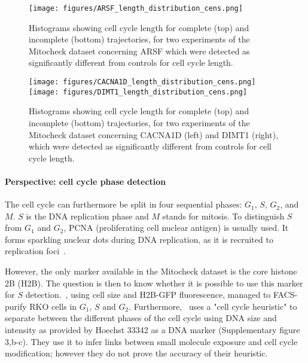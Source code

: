 \begin{figure*}[ht!]
\centerline{\texttt{[image: figures/ARSF\_length\_distribution\_cens.png]}}
\caption{Histograms showing cell cycle length for complete (top) and incomplete (bottom) trajectories, for two experiments of the Mitocheck dataset concerning ARSF which were detected as significantly different from controls for cell cycle length.}
\label{ARSF}
\end{figure*}
\begin{figure*}[ht!]
\centerline{\texttt{[image: figures/CACNA1D\_length\_distribution\_cens.png]}
\texttt{[image: figures/DIMT1\_length\_distribution\_cens.png]}
}
\caption{Histograms showing cell cycle length for complete (top) and incomplete (bottom) trajectories, for two experiments of the Mitocheck dataset concerning CACNA1D (left) and DIMT1 (right), which were detected as significantly different from controls for cell cycle length.}
\label{CAC}
\end{figure*}

\paragraph{Perspective: cell cycle phase detection}
The cell cycle can furthermore be split in four sequential phases: $G_1$, $S$, $G_2$, and $M$. $S$ is the DNA replication phase and $M$ stands for mitosis. To distinguish $S$ from $G_1$ and $G_2$, PCNA (proliferating cell nuclear antigen) is usually used. It forms sparkling nuclear dots during DNA replication, as it is recruited to replication foci~\cite{pmid10769021}.

However, the only marker available in the Mitocheck dataset is the core histone 2B (H2B). The question is then to know whether it is possible to use this marker for $S$ detection.~\cite{pmid16765323}, using cell size and H2B-GFP fluorescence, managed to FACS-purify RKO cells in $G_1$, $S$ and $G_2$. Furthermore,~\cite{pmid17401369} uses a "cell cycle heuristic" to separate between the different phases of the cell cycle using DNA size and intensity as provided by Hoechst 33342 as a DNA marker (Supplementary figure 3,b-c). They use it to infer links between small molecule exposure and cell cycle modification; however they do not prove the accuracy of their heuristic.

